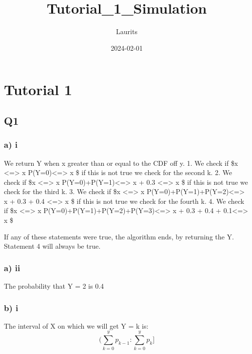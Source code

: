 \documentclass[
]{article}
\title{Tutorial\_1\_Simulation}
\author{Laurits}
\date{2024-02-01}
\begin{document}
\maketitle

\hypertarget{tutorial-1}{%
\section{Tutorial 1}\label{tutorial-1}}

\hypertarget{q1}{%
\subsection{Q1}\label{q1}}

\hypertarget{a-i}{%
\subsubsection{a) i}\label{a-i}}

We return Y when x greater than or equal to the CDF off y. 1. We check
if \$x \le {} \textless=\textgreater{} x
\le P(Y=0)\textless=\textgreater{} x  \$ if this is not true we
check for the second k. 2. We check if \$x \le {}
\textless=\textgreater{} x \le P(Y=0)+P(Y=1)\textless=\textgreater{} x
 + 0.3 \textless=\textgreater{} x  \$ if this is not true
we check for the third k. 3. We check if \$x \le {}
\textless=\textgreater{} x
\le P(Y=0)+P(Y=1)+P(Y=2)\textless=\textgreater{} x  + 0.3 + 0.4
\textless=\textgreater{} x  \$ if this is not true we check for
the fourth k. 4. We check if \$x \le {} \textless=\textgreater{}
x \le P(Y=0)+P(Y=1)+P(Y=2)+P(Y=3)\textless=\textgreater{} x  +
0.3 + 0.4 + 0.1\textless=\textgreater{} x  \$

If any of these statements were true, the algorithm ends, by returning
the Y. Statement 4 will always be true.

\hypertarget{a-ii}{%
\subsubsection{a) ii}\label{a-ii}}

The probability that Y = 2 is 0.4

\hypertarget{b-i}{%
\subsubsection{b) i}\label{b-i}}

The interval of X on which we will get Y = k is:
\[(\sum^{y}_{k=0}{p_{k-1}}:\sum^{y}_{k=0}{p_{k}}]\]
\end{document}
